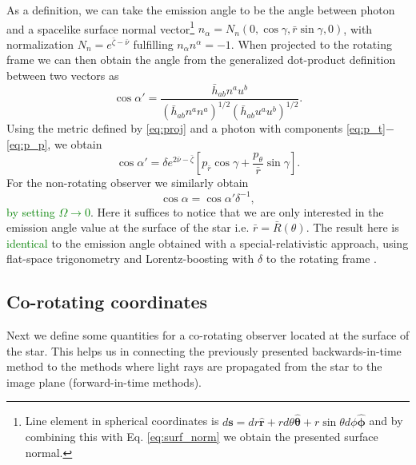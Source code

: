 \documentclass{aa}
\newcommand{\be}{\begin{equation}}
\newcommand{\ee}{\end{equation}}
\renewcommand{\vec}[1]{\ensuremath{\boldsymbol{#1}}}
\newcommand{\refe}[1]{\textcolor{green}{{#1}}}
\newcommand{\refedel}[1]{}
\newcommand{\rb}{\ensuremath{\bar{r}}}
\newcommand{\nub}{\ensuremath{\bar{\nu}}}
\newcommand{\zetab}{\ensuremath{\bar{\zeta}}}
\begin{document}
As a definition, we can take the emission angle to be the angle between photon and a spacelike surface normal vector\footnote{
Line element in spherical coordinates is $d\vec{s} = dr \vec{\hat{r}} + r d\theta \vec{\hat{\theta}} + r \sin\theta d\phi \vec{\hat{\phi}}$ and by combining this with Eq. \eqref{eq:surf_norm} we obtain the presented surface normal.
}
$n_{\alpha} = N_n (0, \cos\gamma, \rb \sin\gamma, 0)$, with normalization $N_n = e^{\zetab - \nub}$ fulfilling $n_{\alpha}n^{\alpha} = -1$.  
When projected to the rotating frame we can then obtain the angle from the generalized dot-product definition between two vectors as
\be\label{eq:gen_angle}
\cos\alpha' = \frac{\bar{h}_{ab}n^a u^b}{(\bar{h}_{ab} n^a n^a)^{1/2} (\bar{h}_{ab} u^a u^b)^{1/2}}.
\ee
Using the metric defined by \eqref{eq:proj} and a photon with components \eqref{eq:p_t}$-$\eqref{eq:p_p}, we obtain
\be\label{eq:cosap}
\cos\alpha' = \delta e^{2\nub-\zetab} \left[ p_{\rb} \cos\gamma + \frac{p_{\theta}}{\rb}\sin\gamma \right].
\ee
For the non-rotating observer we similarly obtain 
\be\label{eq:cosa}
\cos\alpha = \cos\alpha' \delta^{-1},
\ee
\refe{by setting $\Omega \rightarrow 0$}.
Here it suffices to notice that we are only interested in the emission angle value at the surface of the star i.e. $\rb = \bar{R}(\theta)$.
The result here is \refe{identical} to the emission angle obtained with a special-relativistic approach, using flat-space trigonometry and Lorentz-boosting with $\delta$ to the rotating frame \citep[see e.g.,][]{PB06}.



\subsection{Co-rotating coordinates\refedel{ frame}}\label{sect:coords}
Next we define some quantities for a co-rotating observer located at the surface of the star.
This helps us in connecting the previously presented backwards-in-time method to the methods where light rays are propagated from the star to the image plane (forward-in-time methods).
\end{document}

